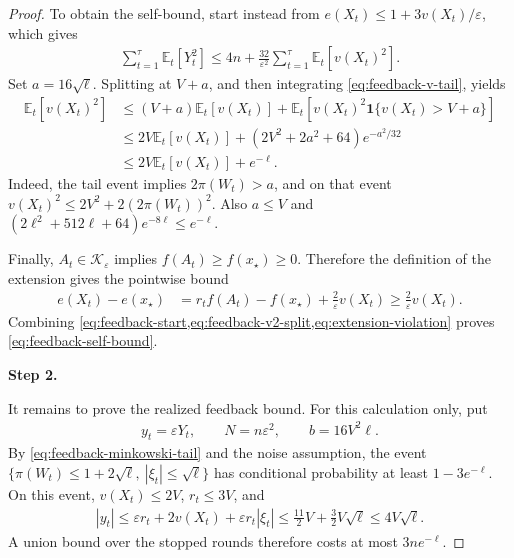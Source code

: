 \documentclass[11pt]{article}
\newcommand{\proofstepinline}[1]{%
    {\sffamily\bfseries\color{blue!55!black}Step #1.}\enspace
}
\newcommand{\E}{\mathbb E}
\newcommand{\K}{\mathcal K}
\newcommand{\1}{\mathbf 1}
\newcommand{\eps}{\varepsilon}
\begin{document}
\begin{proof}
    To obtain the self-bound, start instead from
    $e(X_t)\leq1+3v(X_t)/\eps$, which gives
    \begin{align}
        \sum_{t=1}^\tau\E_t[Y_t^2]
        \leq4n+\frac{32}{\eps^2}
        \sum_{t=1}^\tau\E_t[v(X_t)^2].
        \label{eq:feedback-start}
    \end{align}
    Set $a=16\sqrt\ell$. Splitting at $V+a$, and then integrating
    \eqref{eq:feedback-v-tail}, yields
    \begin{align}
        \E_t[v(X_t)^2]
         & \leq(V+a)\E_t[v(X_t)]
        +\E_t\left[v(X_t)^2\1\{v(X_t)>V+a\}\right]
        \\
         & \leq2V\E_t[v(X_t)]
        +\left(2V^2+2a^2+64\right)e^{-a^2/32}
        \\
         & \leq2V\E_t[v(X_t)]+e^{-\ell}.
        \label{eq:feedback-v2-split}
    \end{align}
    Indeed, the tail event implies $2\pi(W_t)>a$, and on that event
    $v(X_t)^2\leq2V^2+2(2\pi(W_t))^2$. Also $a\leq V$ and
    $(2\ell^2+512\ell+64)e^{-8\ell}\leq e^{-\ell}$.

    Finally, $A_t\in\K_\eps$ implies $f(A_t)\geq f(x_\star)\geq0$.
    Therefore the definition of the extension gives the pointwise bound
    \begin{align}
        e(X_t)-e(x_\star)
         & =r_tf(A_t)-f(x_\star)+\frac2\eps v(X_t)
        \geq\frac2\eps v(X_t).
        \label{eq:extension-violation}
    \end{align}
    Combining \cref{eq:feedback-start,eq:feedback-v2-split,eq:extension-violation}
    proves \eqref{eq:feedback-self-bound}.

    \proofstepinline{2}
    It remains to prove the realized feedback bound. For this calculation
    only, put
    \begin{align}
        y_t=\eps Y_t,
        \qquad N=n\eps^2,
        \qquad b=16V^2\ell.
    \end{align}
    By \eqref{eq:feedback-minkowski-tail} and the noise assumption, the
    event
    $\{\pi(W_t)\leq1+2\sqrt\ell,\ |\xi_t|\leq\sqrt\ell\}$
    has conditional probability at least $1-3e^{-\ell}$.
    On this event, $v(X_t)\leq2V$, $r_t\leq3V$, and
    \begin{align}
        |y_t|
        \leq\eps r_t+2v(X_t)+\eps r_t|\xi_t|
        \leq\frac{11}{2}V+\frac32V\sqrt\ell
        \leq4V\sqrt\ell.
        \label{eq:feedback-cap}
    \end{align}
    A union bound over the stopped rounds therefore costs at most
    $3ne^{-\ell}$.


\end{proof}
\end{document}
